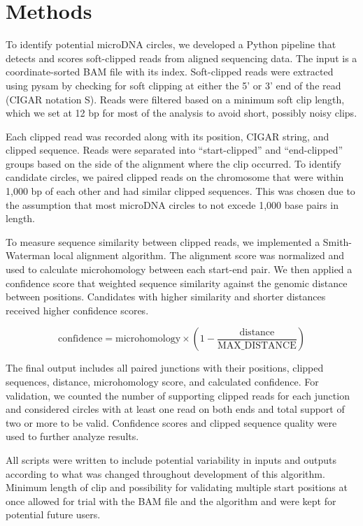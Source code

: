 \documentclass[11pt, letterpaper]{article}
\begin{document}
\section{Methods}

To identify potential microDNA circles, we developed a Python pipeline that 
detects and scores soft-clipped reads from aligned sequencing data. The input 
is a coordinate-sorted BAM file with its index. Soft-clipped reads were 
extracted using pysam by checking for soft clipping at either the 5' or 3' 
end of the read (CIGAR notation S). Reads were filtered based on a minimum 
soft clip length, which we set at 12 bp for most of the analysis to avoid 
short, possibly noisy clips.

Each clipped read was recorded along with its position, CIGAR string, and 
clipped sequence. Reads were separated into “start-clipped” and “end-clipped” 
groups based on the side of the alignment where the clip occurred. To identify 
candidate circles, we paired clipped reads on the chromosome that were within 
1,000 bp of each other and had similar clipped sequences. This was chosen due to 
the assumption that most microDNA circles to not excede 1,000 base pairs in length. 

To measure sequence similarity between clipped reads, we implemented a Smith-Waterman 
local alignment algorithm. The alignment score was normalized and used to calculate 
microhomology between each start-end pair. We then applied a confidence score that 
weighted sequence similarity against the genomic distance between positions. Candidates 
with higher similarity and shorter distances received higher confidence scores.

\begin{equation}
    \text{confidence} = \text{microhomology} \times \left(1 - \frac{\text{distance}}{\text{MAX\_DISTANCE}}\right)
    \end{equation}

The final output includes all paired junctions with their positions, clipped sequences, 
distance, microhomology score, and calculated confidence. For validation, we counted the 
number of supporting clipped reads for each junction and considered circles with at least 
one read on both ends and total support of two or more to be valid. Confidence scores and 
clipped sequence quality were used to further analyze results.

All scripts were written to include potential variability in inputs and outputs according 
to what was changed throughout development of this algorithm. Minimum length of clip and 
possibility for validating multiple start positions at once allowed for trial with the 
BAM file and the algorithm and were kept for potential future users. 
\end{document}
